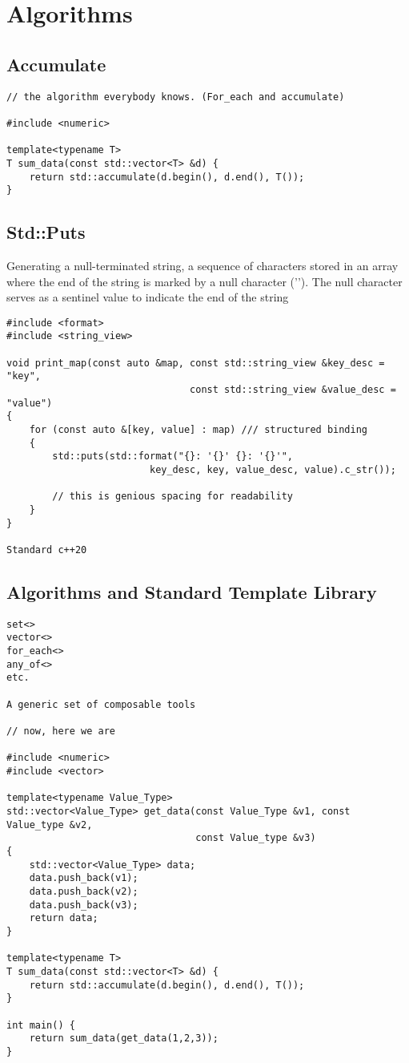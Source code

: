 \documentclass[openany]{report}
\begin{document}
\section{Algorithms}

\subsection{Accumulate}

\begin{verbatim}
// the algorithm everybody knows. (For_each and accumulate)

#include <numeric>

template<typename T>
T sum_data(const std::vector<T> &d) {
    return std::accumulate(d.begin(), d.end(), T());
}
\end{verbatim}

\subsection{Std::Puts}

Generating a null-terminated string,  a sequence of characters stored in an array
where the end of the string is marked by a null character ('\0'). 
The null character serves as a sentinel value to indicate the end of the string

\begin{verbatim}
#include <format>
#include <string_view>

void print_map(const auto &map, const std::string_view &key_desc = "key",
                                const std::string_view &value_desc = "value")
{
    for (const auto &[key, value] : map) /// structured binding
    {
        std::puts(std::format("{}: '{}' {}: '{}'",
                         key_desc, key, value_desc, value).c_str());

        // this is genious spacing for readability
    }
}

Standard c++20
\end{verbatim}
\subsection{Algorithms and Standard Template Library}

\begin{verbatim}
set<>
vector<>
for_each<>
any_of<>
etc.

A generic set of composable tools

// now, here we are

#include <numeric>
#include <vector>

template<typename Value_Type>
std::vector<Value_Type> get_data(const Value_Type &v1, const Value_type &v2,
                                 const Value_type &v3)
{
    std::vector<Value_Type> data;
    data.push_back(v1);
    data.push_back(v2);
    data.push_back(v3);
    return data;
}

template<typename T>
T sum_data(const std::vector<T> &d) {
    return std::accumulate(d.begin(), d.end(), T());
}

int main() {
    return sum_data(get_data(1,2,3));
}
\end{verbatim}
\end{document}
